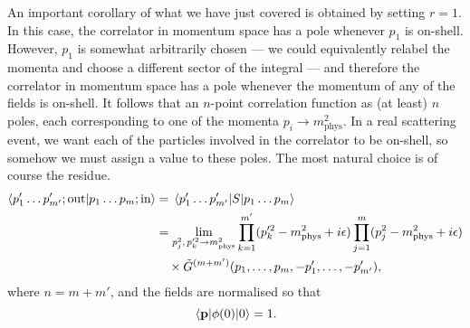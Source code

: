 \documentclass{article}
\numberwithin{equation}{section}
\begin{document}
An important corollary of what we have just covered is obtained by setting $r=1$. In this case, the correlator in momentum space has a pole whenever $p_1$ is on-shell. However, $p_1$ is somewhat arbitrarily chosen --- we could equivalently relabel the momenta and choose a different sector of the integral --- and therefore the correlator in momentum space has a pole whenever the momentum of any of the fields is on-shell. It follows that an $n$-point correlation function as (at least) $n$ poles, each corresponding to one of the momenta $p_i \rightarrow m_{\text{phys}}^2$. In a real scattering event, we want each of the particles involved in the correlator to be on-shell, so somehow we must assign a value to these poles. The most natural choice is of course the residue. 
\begin{equation}
\begin{aligned}
    \braket{p'_1 \dots p'_{m'}; \text{out}}{p_1 \dots p_m; \text{in}} &= \mel{p'_1 \dots p'_{m'}}{S}{p_1 \dots p_m} \\
    &= \lim_{p_j^2, \, p_k^{\prime 2} \rightarrow m_{\text{phys}}^2} \prod_{k=1}^{m'} (p_k^{\prime 2} - m_{\text{phys}}^2 + i\epsilon) \prod_{j=1}^{m} (p_j^2 - m_{\text{phys}}^2 + i\epsilon) \\
    & \quad \times \tilde{G}^{(m+m')} (p_1, \dots, p_m, -p'_1, \dots, -p'_{m'}),
\end{aligned}
\end{equation}  
where $n=m + m'$, and the fields are normalised so that
\begin{equation}
    \mel{\vb{p}}{\phi(0)}{0} = 1.
\end{equation}
\end{document}
